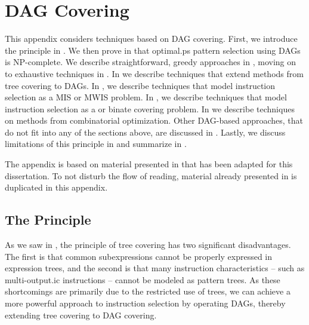%

\chapter{DAG Covering}

This appendix considers techniques based on \gls{DAG covering}.
%
First, we introduce the principle in .
%
We then prove in  that \gls{optimal.ps} \gls{pattern
  selection} using \glspl{DAG} is NP-complete.
%
We describe straightforward, greedy approaches in
, moving on to exhaustive techniques in
.
%
In  we describe
techniques that extend methods from \gls{tree covering} to \glspl{DAG}.
%
%
%
%
In , we describe techniques that model
\gls{instruction selection} as a \gls{MIS} or \gls{MWIS} problem.
%
%
%
%
In , we describe techniques that model
\gls{instruction selection} as a  or \gls{binate
  covering} problem.
%
In  we describe
techniques on methods from combinatorial optimization.
%
Other \gls{DAG}-based approaches, that do not fit into any of the sections
above, are discussed in .
%
Lastly, we discuss limitations of this principle in 
and summarize in .

The appendix is based on material presented in
\cite[Chap.]{HjortBlindell:2016:Survey} that has been adapted for
this dissertation.
%
To not disturb the flow of reading, material already presented in
 is duplicated in this appendix.


\section{The Principle}

As we saw in , the \gls{principle} of \gls{tree
  covering} has two significant disadvantages.
%
The first is that common subexpressions cannot be properly expressed in
\glspl{expression tree}, and the second is that many \glspl{instruction
  characteristic} -- such as \gls{multi-output.ic} \glspl{instruction} -- cannot
be modeled as \glspl{pattern tree}.
%
As these shortcomings are primarily due to the restricted use of \glspl{tree},
we can achieve a more powerful approach to \gls{instruction selection} by
operating \glspl{DAG}, thereby extending \gls{tree covering} to \gls{DAG
  covering}.

